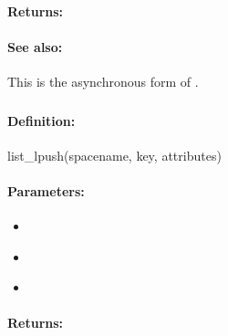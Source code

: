 \paragraph{Returns:}


\paragraph{See also:}  This is the asynchronous form of .

\pagebreak
\subsubsection{}
\label{api:ruby:list_lpush}


\paragraph{Definition:}
\begin{rubycode}
list_lpush(spacename, key, attributes)
\end{rubycode}

\paragraph{Parameters:}
\begin{itemize}[noitemsep]
\item {}\\

\item {}\\

\item {}\\

\end{itemize}

\paragraph{Returns:}


\pagebreak
\subsubsection{}
\label{api:ruby:async_list_lpush}


